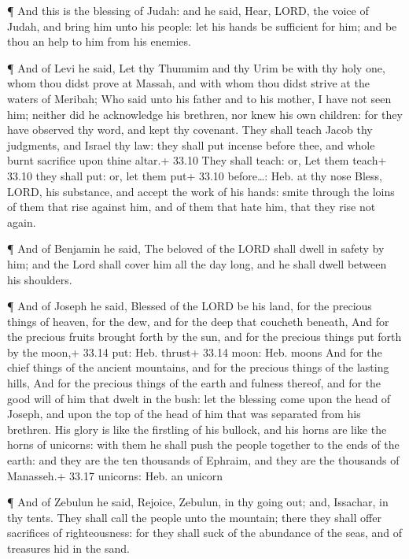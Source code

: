  ¶ And this is the blessing of Judah: and he said, Hear,
LORD, the voice of Judah, and bring him unto his people: let his hands
be sufficient for him; and be thou an help to him from his enemies.

 ¶ And of Levi he said, Let thy Thummim and thy Urim be with
thy holy one, whom thou didst prove at Massah, and with whom thou didst
strive at the waters of Meribah;  Who said unto his father
and to his mother, I have not seen him; neither did he acknowledge his
brethren, nor knew his own children: for they have observed thy word,
and kept thy covenant.  They shall teach Jacob thy
judgments, and Israel thy law: they shall put incense before thee, and
whole burnt sacrifice upon thine altar.+ 33.10 They shall teach: or, Let
them teach+ 33.10 they shall put: or, let them put+ 33.10 before\ldots:
Heb. at thy nose  Bless, LORD, his substance, and accept
the work of his hands: smite through the loins of them that rise against
him, and of them that hate him, that they rise not again.

 ¶ And of Benjamin he said, The beloved of the LORD shall
dwell in safety by him; and the Lord shall cover him all the day long,
and he shall dwell between his shoulders.

 ¶ And of Joseph he said, Blessed of the LORD be his land,
for the precious things of heaven, for the dew, and for the deep that
coucheth beneath,  And for the precious fruits brought
forth by the sun, and for the precious things put forth by the moon,+
33.14 put: Heb. thrust+ 33.14 moon: Heb. moons  And for the
chief things of the ancient mountains, and for the precious things of
the lasting hills,  And for the precious things of the
earth and fulness thereof, and for the good will of him that dwelt in
the bush: let the blessing come upon the head of Joseph, and upon the
top of the head of him that was separated from his brethren.
 His glory is like the firstling of his bullock, and his
horns are like the horns of unicorns: with them he shall push the people
together to the ends of the earth: and they are the ten thousands of
Ephraim, and they are the thousands of Manasseh.+ 33.17 unicorns: Heb.
an unicorn

 ¶ And of Zebulun he said, Rejoice, Zebulun, in thy going
out; and, Issachar, in thy tents.  They shall call the
people unto the mountain; there they shall offer sacrifices of
righteousness: for they shall suck of the abundance of the seas, and of
treasures hid in the sand.


